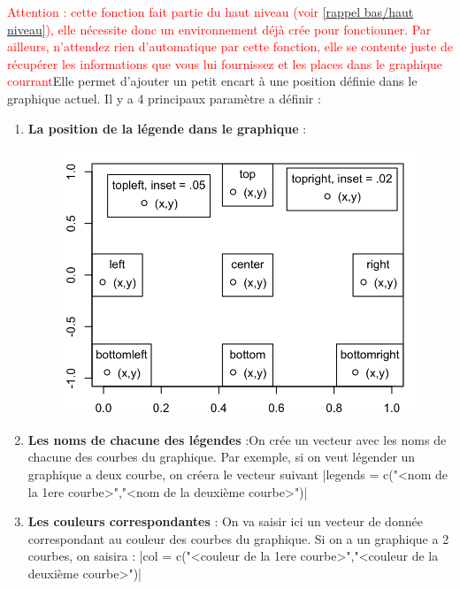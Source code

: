 \documentclass{article}
\newcommand{\warning}[1]{\textcolor{red}{#1}}
\begin{document}
\warning{Attention : cette fonction fait partie du haut niveau (voir \ref{rappel bas/haut niveau}), elle nécessite donc un environnement déjà crée pour fonctionner. Par ailleurs, n'attendez rien d'automatique par cette fonction, elle se contente juste de récupérer les informations que vous lui fournissez et les places dans le graphique courrant}\newline Elle permet d'ajouter un petit encart à une position définie dans le graphique actuel. Il y a 4 principaux paramètre a définir : 
\begin{enumerate}
    \item \textbf{La position de la légende dans le graphique} : 
    \begin{figure}[!h]
        \centering
        \includegraphics[scale=0.4]{add-legend-to-plot-legend-positions.png}
    \end{figure}
    \item \textbf{Les noms de chacune des légendes} :\newline On crée un vecteur avec les noms de chacune des courbes du graphique. \newline Par exemple, si on veut légender un graphique a deux courbe, on créera le vecteur suivant 
    |legends = c("<nom de la 1ere courbe>","<nom de la deuxième courbe>")|
    \item \textbf{Les couleurs correspondantes} : \newline On va saisir ici un vecteur de donnée correspondant au couleur des courbes du graphique. Si on a un graphique a 2 courbes, on saisira : 
    |col = c("<couleur de la 1ere courbe>","<couleur de la deuxième courbe>")|

\end{enumerate}
\end{document}
